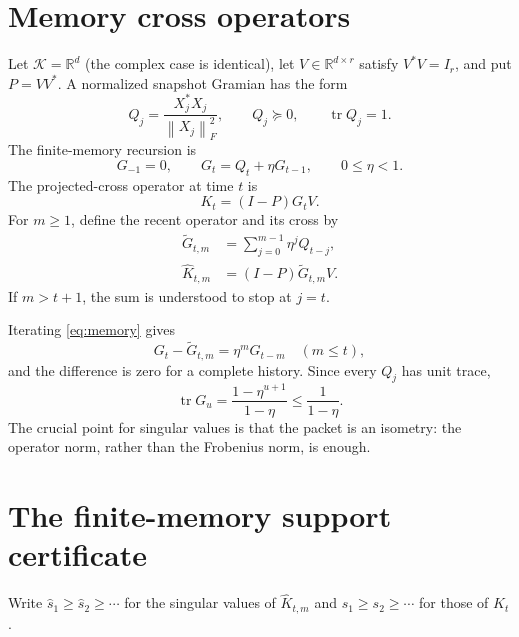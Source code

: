 \documentclass[11pt]{article}
\theoremstyle{definition}
\theoremstyle{remark}
\newcommand{\norm}[1]{\left\lVert#1\right\rVert}
\newcommand{\tr}{\operatorname{tr}}
\begin{document}
\section{Memory cross operators}
\label{sec:setting}

Let $\mathcal K=\mathbb R^d$ (the complex case is identical), let
$V\in\mathbb R^{d\times r}$ satisfy $V^*V=I_r$, and put $P=VV^*$.  A
normalized snapshot Gramian has the form
\begin{equation}
 Q_j=\frac{X_j^*X_j}{\norm{X_j}_F^2},
 \qquad Q_j\succeq0,
 \qquad \tr Q_j=1.
 \label{eq:snapshot}
\end{equation}
The finite-memory recursion is
\begin{equation}
 G_{-1}=0,
 \qquad G_t=Q_t+\eta G_{t-1},
 \qquad 0\le\eta<1.
 \label{eq:memory}
\end{equation}
The projected-cross operator at time $t$ is
\begin{equation}
 K_t=(I-P)G_tV.
 \label{eq:fullcross}
\end{equation}
For $m\ge1$, define the recent operator and its cross by
\begin{align}
 \widetilde G_{t,m}&=\sum_{j=0}^{m-1}\eta^jQ_{t-j},
 \label{eq:recentgram}\\
 \widehat K_{t,m}&=(I-P)\widetilde G_{t,m}V.
 \label{eq:recentcross}
\end{align}
If $m>t+1$, the sum is understood to stop at $j=t$.

Iterating \eqref{eq:memory} gives
\begin{equation}
 G_t-\widetilde G_{t,m}=\eta^mG_{t-m}
 \quad (m\le t),
 \label{eq:tailidentity}
\end{equation}
and the difference is zero for a complete history.  Since every $Q_j$ has
unit trace,
\begin{equation}
 \tr G_u=\frac{1-\eta^{u+1}}{1-\eta}
 \le\frac1{1-\eta}.
 \label{eq:traceclock}
\end{equation}
The crucial point for singular values is that the packet is an isometry:
the operator norm, rather than the Frobenius norm, is enough.

\section{The finite-memory support certificate}
\label{sec:certificate}

Write $\widehat s_1\ge\widehat s_2\ge\cdots$ for the singular values of
$\widehat K_{t,m}$ and $s_1\ge s_2\ge\cdots$ for those of $K_t$.
\end{document}
